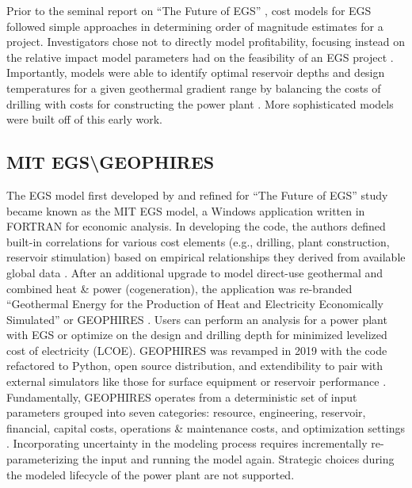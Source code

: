 Prior to the seminal report on “The Future of EGS” \citep{tester_future_2006}, cost models for EGS followed simple approaches in determining order of magnitude estimates for a project. Investigators chose not to directly model profitability, focusing instead on the relative impact model parameters had on the feasibility of an EGS project \citep{augustine_hydrothermal_2009}. Importantly, models were able to identify optimal reservoir depths and design temperatures for a given geothermal gradient range by balancing the costs of drilling with costs for constructing the power plant \citep{tester_economic_1990}. More sophisticated models were built off of this early work.

\subsection{MIT EGS\textbackslash GEOPHIRES}\label{ch2:geophires}
The EGS model first developed by \citet{tester_economic_1990} and refined for “The Future of EGS” study \citep{tester_future_2006} became known as the MIT EGS model, a Windows application written in FORTRAN for economic analysis. In developing the code, the authors defined built-in correlations for various cost elements (e.g., drilling, plant construction, reservoir stimulation) based on empirical relationships they derived from available global data \citep{tester_future_2006}. After an additional upgrade to model direct-use geothermal and combined heat \& power (cogeneration), the application was re-branded “Geothermal Energy for the Production of Heat and Electricity Economically Simulated” or GEOPHIRES \citep{beckers_introducing_2013}. Users can perform an analysis for a power plant with EGS or optimize on the design and drilling depth for minimized levelized cost of electricity (LCOE). GEOPHIRES was revamped in 2019 with the code refactored to Python, open source distribution, and extendibility to pair with external simulators like those for surface equipment or reservoir performance \citep{beckers_geophires_2019}. Fundamentally, GEOPHIRES operates from a deterministic set of input parameters grouped into seven categories: resource, engineering, reservoir, financial, capital costs, operations \& maintenance costs, and optimization settings \citep{beckers_introducing_2013}. Incorporating uncertainty in the modeling process requires incrementally re-parameterizing the input and running the model again. Strategic choices during the modeled lifecycle of the power plant are not supported.

